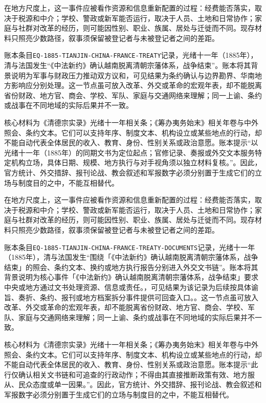 在地方尺度上，这一事件应被看作资源和信息重新配置的过程：经费能否落实，取决于税源和中介；学校、警政或新军能否运行，取决于人员、土地和日常协作；家庭与社群对改革的经历，则可能因性别、职业、族属、居处与迁徙而不同。现存材料只照亮少数路径，叙事须保留被登记者与未被登记者之间的差距。

账本条目\texttt{EQ-1885-TIANJIN-CHINA-FRANCE-TREATY}记录，光绪十一年（1885年），清与法国发生“《中法新约》确认越南脱离清朝宗藩体系，战争结束”。账本将其背景说明为军事与财政压力推动双方议和，可见结果为条约确认与边界勘界、华南地方影响应分别处理。这一节点虽可放入改革、外交或革命的宏观年表，却不能脱离省份财政、地方官、商会、学校、军队、家庭与交通网络来理解；同一上谕、条约或战事在不同地域的实际后果并不一致。

核心材料为《清德宗实录》光绪十一年相关条；《筹办夷务始末》相关年卷与中外照会、条约文本。它们可以支持年序、制度文本、机构设立或某些地点的行动，却不能自动代表全体居民的收入、教育、身份、性别关系或政治意愿。账本提示“以光绪十一年（1885年）的同期文书为定位起点；官修记录、奏报或外交文本服务特定机构立场，具体日期、规模、地方执行与对手视角须以独立材料复核。”。因此，官方统计、外交措辞、报刊论战、教会叙述和军报数字必须分别置于生成它们的立场与制度目的之中，不能互相替代。

在地方尺度上，这一事件应被看作资源和信息重新配置的过程：经费能否落实，取决于税源和中介；学校、警政或新军能否运行，取决于人员、土地和日常协作；家庭与社群对改革的经历，则可能因性别、职业、族属、居处与迁徙而不同。现存材料只照亮少数路径，叙事须保留被登记者与未被登记者之间的差距。

账本条目\texttt{EQ-1885-TIANJIN-CHINA-FRANCE-TREATY-DOCUMENTS}记录，光绪十一年（1885年），清与法国发生“围绕「《中法新约》确认越南脱离清朝宗藩体系，战争结束」的照会、条约文本、换约或地方执行报告分别进入外交文书链”。账本将其背景说明为核心事件「《中法新约》确认越南脱离清朝宗藩体系，战争结束」要求中央或地方通过文书处理资源、信息或责任。，可见结果为该记录为后续按具体谕旨、奏折、条约、报刊或地方档案拆分事件提供可回查入口。。这一节点虽可放入改革、外交或革命的宏观年表，却不能脱离省份财政、地方官、商会、学校、军队、家庭与交通网络来理解；同一上谕、条约或战事在不同地域的实际后果并不一致。

核心材料为《清德宗实录》光绪十一年相关条；《筹办夷务始末》相关年卷与中外照会、条约文本。它们可以支持年序、制度文本、机构设立或某些地点的行动，却不能自动代表全体居民的收入、教育、身份、性别关系或政治意愿。账本提示“此行仅确认相关文书链和可追查的行政动作；不得由其直接推断政策有效、地方服从、民众态度或单一因果。”。因此，官方统计、外交措辞、报刊论战、教会叙述和军报数字必须分别置于生成它们的立场与制度目的之中，不能互相替代。

